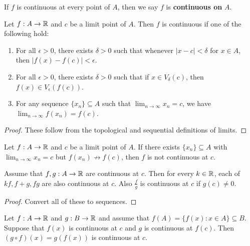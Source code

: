 \begin{definition}
  If $f$ is continuous at every point of $A$, then
  we say $f$ is \textbf{continuous on} $A$.
\end{definition}

\begin{theorem}
  Let $f : A \to \mathbb{R}$ and $c$ be a limit point of $A$. Then
  $f$ is continuous if one of the following hold:
  \begin{enumerate}
    \item For all $\epsilon > 0$, there exists $\delta > 0$ such
      that whenever $|x - c| < \delta$ for $x \in A$, then
      $|f(x) - f(c)| < \epsilon$.
    \item For all $\epsilon > 0$, there exists $\delta > 0$
      such that if $x \in V_\delta(c)$, then
      $f(x) \in V_\epsilon(f(c))$.
    \item For any sequence $\{x_n\} \subseteq A$ such that
      $\lim_{n \to \infty} x_n = c$, we have
      $\lim_{n \to \infty} f(x_n) = f(c)$.
  \end{enumerate}
\end{theorem}

\begin{proof}
  These follow from the topological and sequential definitions
  of limits.
\end{proof}

\begin{corollary}
  Let $f : A \to \mathbb{R}$ and $c$ be a limit point of $A$. If there
  exists $\{x_n\} \subseteq A$ with $\lim_{n \to \infty} x_n = c$
  but $f(x_n) \not\to f(c)$, then $f$ is not continuous at $c$.
\end{corollary}

\begin{theorem}
  Assume that $f, g : A \to \mathbb{R}$ are continuous at $c$. Then for
  every $k \in \mathbb{R}$, each of $kf, f + g, fg$ are also continuous at
  $c$. Also $\frac{f}{g}$ is continuous at $c$ if $g(c) \ne 0$.
\end{theorem}

\begin{proof}
  Convert all of these to sequences.
\end{proof}

\begin{theorem}
  Let $f : A \to \mathbb{R}$ and $g : B \to \mathbb{R}$ and assume that
  $f(A) = \{f(x) : x \in A\} \subseteq B$. Suppose that $f(x)$ is
  continuous at $c$ and $g$ is continuous at $f(c)$. Then
  $(g \circ f)(x) = g(f(x))$ is continuous at $c$.
\end{theorem}

